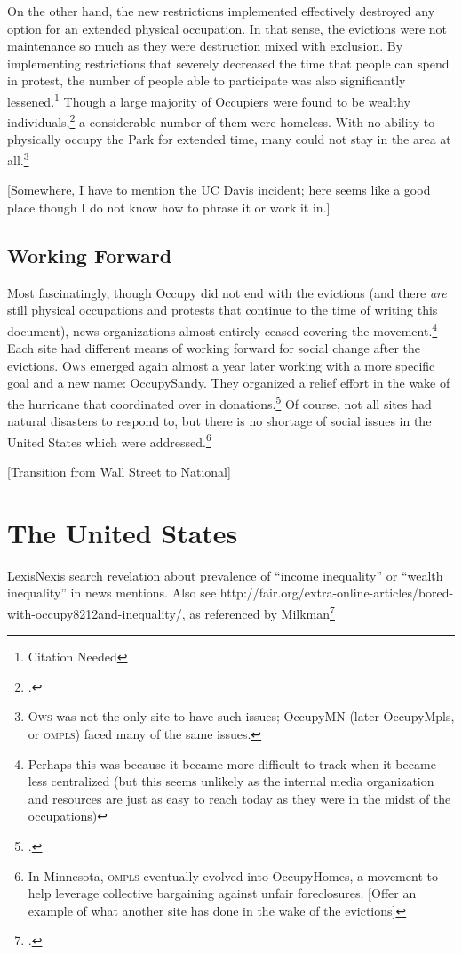 \documentclass{article}
\begin{document}
On the other hand, the new restrictions implemented effectively destroyed any option for an extended physical occupation.
In that sense, the evictions were not maintenance so much as they were destruction mixed with exclusion.
By implementing restrictions that severely decreased the time that people can spend in protest, the number of people able to participate was also significantly lessened.\footnote{Citation Needed}
Though a large majority of Occupiers were found to be wealthy individuals,\footcite[10]{milkman13} a considerable number of them were homeless.
With no ability to physically occupy the Park for extended time, many could not stay in the area at all.\footnote{\textsc{Ows} was not the only site to have such issues; OccupyMN (later OccupyMpls, or \textsc{ompls}) faced many of the same issues.}

[Somewhere, I have to mention the UC Davis incident; here seems like a good place though I do not know how to phrase it or work it in.]

\subsection{Working Forward}
Most fascinatingly, though Occupy did not end with the evictions (and there \emph{are} still physical occupations and protests that continue to the time of writing this document), news organizations almost entirely ceased covering the movement.\footnote{Perhaps this was because it became more difficult to track when it became less centralized (but this seems unlikely as the internal media organization and resources are just as easy to reach today as they were in the midst of the occupations)}
Each site had different means of working forward for social change after the evictions.
\textsc{Ows} emerged again almost a year later working with a more specific goal and a new name: OccupySandy.
They organized a relief effort in the wake of the hurricane that coordinated over  in donations.\footcite[35--36]{milkman13}
Of course, not all sites had natural disasters to respond to, but there is no shortage of social issues in the United States which were addressed.\footnote{In Minnesota, \textsc{ompls} eventually evolved into OccupyHomes, a movement to help leverage collective bargaining against unfair foreclosures. [Offer an example of what another site has done in the wake of the evictions]}

[Transition from Wall Street to National]

\section{The United States}
LexisNexis search revelation about prevalence of ``income inequality'' or ``wealth inequality'' in news mentions.
Also see http://fair.org/extra-online-articles/bored-with-occupy8212and-inequality/, as referenced by Milkman\footcite[38]{milkman13}
\end{document}
